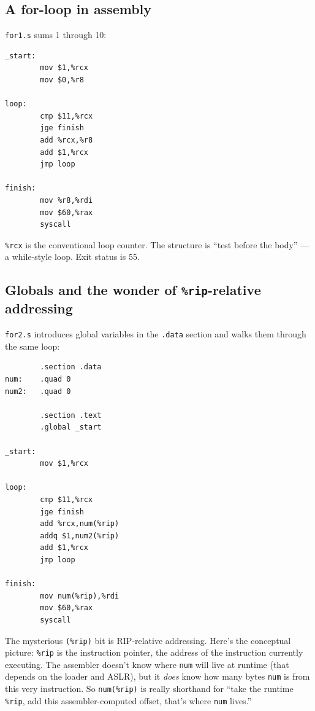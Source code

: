 \documentclass[11pt]{article}
\begin{document}
\subsection*{A for-loop in assembly}

\texttt{for1.s} sums 1 through 10:

\begin{lstlisting}
_start:
        mov $1,%rcx
        mov $0,%r8

loop:
        cmp $11,%rcx
        jge finish
        add %rcx,%r8
        add $1,%rcx
        jmp loop

finish:
        mov %r8,%rdi
        mov $60,%rax
        syscall
\end{lstlisting}

\texttt{\%rcx} is the conventional loop counter. The structure is
``test before the body'' --- a while-style loop. Exit status is 55.

\subsection*{Globals and the wonder of \texttt{\%rip}-relative addressing}

\texttt{for2.s} introduces global variables in the \texttt{.data}
section and walks them through the same loop:

\begin{lstlisting}
        .section .data
num:    .quad 0
num2:   .quad 0

        .section .text
        .global _start

_start:
        mov $1,%rcx

loop:
        cmp $11,%rcx
        jge finish
        add %rcx,num(%rip)
        addq $1,num2(%rip)
        add $1,%rcx
        jmp loop

finish:
        mov num(%rip),%rdi
        mov $60,%rax
        syscall
\end{lstlisting}

The mysterious \texttt{(\%rip)} bit is RIP-relative addressing.
Here's the conceptual picture: \texttt{\%rip} is the instruction
pointer, the address of the instruction currently executing. The
assembler doesn't know where \texttt{num} will live at runtime
(that depends on the loader and ASLR), but it \emph{does} know how
many bytes \texttt{num} is from this very instruction. So
\texttt{num(\%rip)} is really shorthand for ``take the runtime
\texttt{\%rip}, add this assembler-computed offset, that's where
\texttt{num} lives.''
\end{document}
